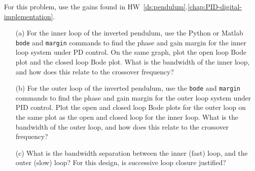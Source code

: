 For this problem, use the gains found in HW~\ref{ds:pendulum}.\ref{chap:PID-digital-implementation}.
\begin{itemize} \item[]
\item[(a)]  For the inner loop of the inverted pendulum, use the Python or Matlab \texttt{bode} and \texttt{margin} commands to find the phase and gain margin for the inner loop system under PD control.  On the same graph, plot the open loop Bode plot and the closed loop Bode plot.  What is the bandwidth of the inner loop, and how does this relate to the crossover frequency?

\item[(b)]  For the outer loop of the inverted pendulum, use the \texttt{bode} and \texttt{margin} commands to find the phase and gain margin for the outer loop system under PID control.  Plot the open and closed loop Bode plots for the outer loop on the same plot as the open and closed loop for the inner loop.  What is the bandwidth of the outer loop, and how does this relate to the crossover frequency?

\item[(c)]  What is the bandwidth separation between the inner (fast) loop, and the outer (slow) loop?  For this design, is successive loop closure justified?
\end{itemize}
